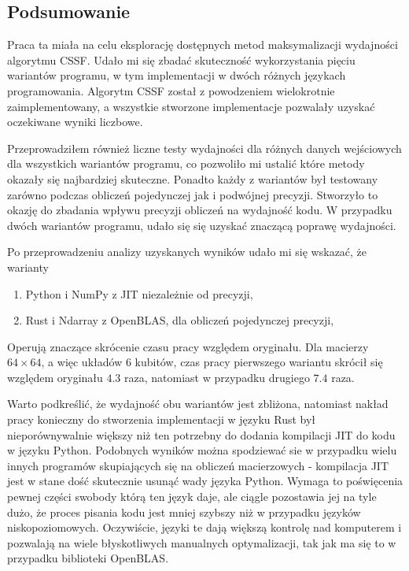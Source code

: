 \documentclass[11pt, a4paper]{article}
\begin{document}
\begin{sloppypar}
    \subsection{Podsumowanie}
    Praca ta miała na celu eksplorację dostępnych metod maksymalizacji wydajności algorytmu
    CSSF. Udało mi się zbadać skuteczność wykorzystania pięciu wariantów programu, w tym
    implementacji w dwóch różnych językach programowania. Algorytm CSSF został z
    powodzeniem wielokrotnie zaimplementowany, a wszystkie stworzone implementacje pozwalały
    uzyskać oczekiwane wyniki liczbowe.

    Przeprowadziłem również liczne testy wydajności dla różnych danych wejściowych dla wszystkich
    wariantów programu, co pozwoliło mi ustalić które metody okazały się najbardziej
    skuteczne. Ponadto każdy z wariantów był testowany zarówno podczas obliczeń pojedynczej
    jak i podwójnej precyzji. Stworzyło to okazję do zbadania wpływu precyzji obliczeń
    na wydajność kodu. W przypadku dwóch wariantów programu, udało się się uzyskać
    znaczącą poprawę wydajności.

    Po przeprowadzeniu analizy uzyskanych wyników udało mi się wskazać, że warianty
    \begin{enumerate}
      \item Python i NumPy z JIT niezależnie od precyzji,

      \item Rust i Ndarray z OpenBLAS, dla obliczeń pojedynczej precyzji,
    \end{enumerate}

    Operują znaczące skrócenie czasu pracy względem oryginału. Dla macierzy $64\times64$,
    a więc układów 6 kubitów, czas pracy pierwszego wariantu skrócił się względem oryginału
    $4.3$ raza, natomiast w przypadku drugiego $7.4$ raza.

    Warto podkreślić, że wydajność obu wariantów jest zbliżona, natomiast nakład pracy
    konieczny do stworzenia implementacji w języku Rust był nieporównywalnie większy niż
    ten potrzebny do dodania kompilacji JIT do kodu w języku Python. Podobnych wyników można
    spodziewać sie w przypadku wielu innych programów skupiających się na obliczeń macierzowych
    - kompilacja JIT jest w stane dość skutecznie usunąć wady języka Python. Wymaga to
    poświęcenia pewnej części swobody którą ten język daje, ale ciągle pozostawia jej na
    tyle dużo, że proces pisania kodu jest mniej szybszy niż w przypadku języków
    niskopoziomowych. Oczywiście, języki te dają większą kontrolę nad komputerem i
    pozwalają na wiele błyskotliwych manualnych optymalizacji, tak jak ma się to w przypadku
    biblioteki OpenBLAS.


\end{sloppypar}
\end{document}
